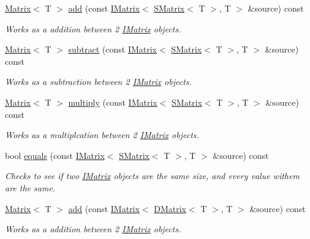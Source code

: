 \begin{DoxyCompactItemize}
\mbox{\hyperlink{class_matrix}{Matrix}}$<$ T $>$ \mbox{\hyperlink{class_s_matrix_afeb78de40327150348c31deb20ebcc6d}{add}} (const \mbox{\hyperlink{class_i_matrix}{I\+Matrix}}$<$ \mbox{\hyperlink{class_s_matrix}{S\+Matrix}}$<$ T $>$, T $>$ \&source) const
\begin{DoxyCompactList}\small\item\em Works as a addition between 2 \mbox{\hyperlink{class_i_matrix}{I\+Matrix}} objects. \end{DoxyCompactList}\item 
\mbox{\hyperlink{class_matrix}{Matrix}}$<$ T $>$ \mbox{\hyperlink{class_s_matrix_ae5950543920513f4ff263055666c1082}{subtract}} (const \mbox{\hyperlink{class_i_matrix}{I\+Matrix}}$<$ \mbox{\hyperlink{class_s_matrix}{S\+Matrix}}$<$ T $>$, T $>$ \&source) const
\begin{DoxyCompactList}\small\item\em Works as a subtraction between 2 \mbox{\hyperlink{class_i_matrix}{I\+Matrix}} objects. \end{DoxyCompactList}\item 
\mbox{\hyperlink{class_matrix}{Matrix}}$<$ T $>$ \mbox{\hyperlink{class_s_matrix_a7a59af4ecdf50b7d0cb901e0de127372}{multiply}} (const \mbox{\hyperlink{class_i_matrix}{I\+Matrix}}$<$ \mbox{\hyperlink{class_s_matrix}{S\+Matrix}}$<$ T $>$, T $>$ \&source) const
\begin{DoxyCompactList}\small\item\em Works as a multiplcation between 2 \mbox{\hyperlink{class_i_matrix}{I\+Matrix}} objects. \end{DoxyCompactList}\item 
bool \mbox{\hyperlink{class_s_matrix_a72278dbea16105244b01d1793a405789}{equals}} (const \mbox{\hyperlink{class_i_matrix}{I\+Matrix}}$<$ \mbox{\hyperlink{class_s_matrix}{S\+Matrix}}$<$ T $>$, T $>$ \&source) const
\begin{DoxyCompactList}\small\item\em Checks to see if two \mbox{\hyperlink{class_i_matrix}{I\+Matrix}} objects are the same size, and every value withem are the same. \end{DoxyCompactList}\item 
\mbox{\hyperlink{class_matrix}{Matrix}}$<$ T $>$ \mbox{\hyperlink{class_s_matrix_aacb1dc2203941a7cd5dfffc299672c7a}{add}} (const \mbox{\hyperlink{class_i_matrix}{I\+Matrix}}$<$ \mbox{\hyperlink{class_d_matrix}{D\+Matrix}}$<$ T $>$, T $>$ \&source) const
\begin{DoxyCompactList}\small\item\em Works as a addition between 2 \mbox{\hyperlink{class_i_matrix}{I\+Matrix}} objects. \end{DoxyCompactList}\item 

\end{DoxyCompactItemize}
